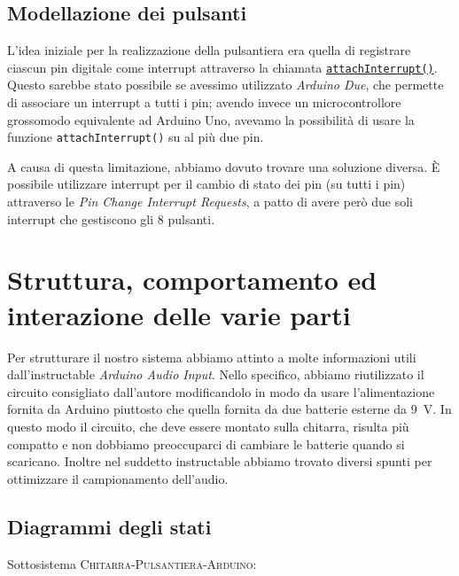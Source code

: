 \documentclass[a4paper,11pt]{article}
\begin{document}
\subsection{Modellazione dei pulsanti}
L'idea iniziale per la realizzazione della pulsantiera era quella di registrare ciascun pin digitale come interrupt attraverso la chiamata \href{http://www.arduino.cc/en/Reference/AttachInterrupt}{\texttt{attachInterrupt()}}. Questo sarebbe stato possibile se avessimo utilizzato \emph{Arduino Due}, che permette di associare un interrupt a tutti i pin; avendo invece un microcontrollore grossomodo equivalente ad Arduino Uno, avevamo la possibilità di usare la funzione \texttt{attachInterrupt()} su al più due pin.

A causa di questa limitazione, abbiamo dovuto trovare una soluzione diversa. È possibile utilizzare interrupt per il cambio di stato dei pin (su tutti i pin) attraverso le \emph{Pin Change Interrupt Requests}\cite{allinterrupts}, a patto di avere però due soli interrupt che gestiscono gli \num{8} pulsanti.

\section{Struttura, comportamento ed interazione delle varie parti}
Per strutturare il nostro sistema abbiamo attinto a molte informazioni utili dall'instructable \emph{Arduino Audio Input}\cite{arduinoinput}. Nello specifico, abbiamo riutilizzato il circuito consigliato dall'autore modificandolo in modo da usare l'alimentazione fornita da Arduino piuttosto che quella fornita da due batterie esterne da \SI{9}{\volt}. In questo modo il circuito, che deve essere montato sulla chitarra, risulta più compatto e non dobbiamo preoccuparci di cambiare le batterie quando si scaricano. Inoltre nel suddetto instructable abbiamo trovato diversi spunti per ottimizzare il campionamento dell'audio.

\newpage
\subsection{Diagrammi degli stati}
\noindent
Sottosistema \textsc{Chitarra-Pulsantiera-Arduino}:

\vspace{3mm}

\end{document}

